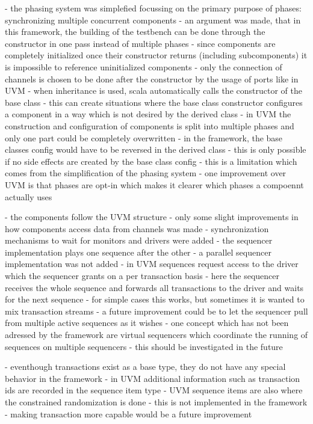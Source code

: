 - the phasing system was simplefied focussing on the primary purpose of phases: synchronizing multiple concurrent components
- an argument was made, that in this framework, the building of the testbench can be done through the constructor in one pass instead of multiple phases
- since components are completely initialized once their constructor returns (including subcomponents) it is impossible to reference uninitialized components
- only the connection of channels is chosen to be done after the constructor by the usage of ports like in UVM
- when inheritance is used, scala automatically calls the constructor of the base class
- this can create situations where the base class constructor configures a component in a way which is not desired by the derived class
- in UVM the construction and configuration of components is split into multiple phases and only one part could be completely overwritten
- in the framework, the base classes config would have to be reversed in the derived class
- this is only possible if no side effects are created by the base class config
- this is a limitation which comes from the simplification of the phasing system
- one improvement over UVM is that phases are opt-in which makes it clearer which phases a compoennt actually uses

- the components follow the UVM structure
- only some slight improvements in how components access data from channels was made
- synchronization mechanisms to wait for monitors and drivers were added
- the sequencer implementation plays one sequence after the other
- a parallel sequencer implementation was not added
- in UVM sequences request access to the driver which the sequencer grants on a per transaction basis
- here the sequencer receives the whole sequence and forwards all transactions to the driver and waits for the next sequence
- for simple cases this works, but sometimes it is wanted to mix transaction streams
- a future improvement could be to let the sequencer pull from multiple active sequences as it wishes
- one concept which has not been adressed by the framework are virtual sequencers which coordinate the running of sequences on multiple sequencers
- this should be investigated in the future

- eventhough transactions exist as a base type, they do not have any special behavior in the framework
- in UVM additional information such as transaction ids are recorded in the sequence item type
- UVM sequence items are also where the constrained randomization is done
- this is not implemented in the framework
- making transaction more capable would be a future improvement

